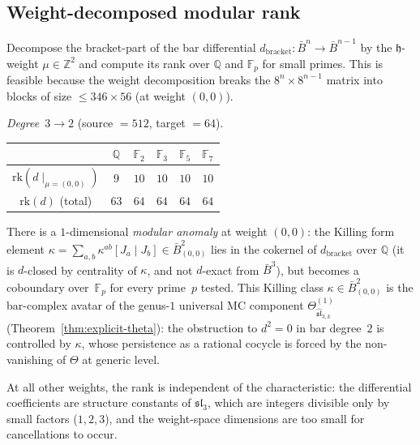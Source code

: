 \subsection{Weight-decomposed modular rank}

\begin{computation}
\label{comp:sl3-modular-rank}

Decompose the bracket-part of the bar differential
$d_{\mathrm{bracket}}\colon \bar{B}^n \to \bar{B}^{n-1}$
by the $\mathfrak{h}$-weight $\mu \in \mathbb{Z}^2$ and
compute its rank over $\mathbb{Q}$ and $\mathbb{F}_p$ for
small primes.  This is feasible because the weight decomposition
breaks the $8^n \times 8^{n-1}$ matrix into blocks of size
$\leq 346 \times 56$ (at weight $(0,0)$).

\emph{Degree~$3 \to 2$} (source $= 512$, target $= 64$).
\begin{center}
\renewcommand{\arraystretch}{1.2}
\begin{tabular}{c|ccccc}
& $\mathbb{Q}$ & $\mathbb{F}_2$ & $\mathbb{F}_3$ &
$\mathbb{F}_5$ & $\mathbb{F}_7$ \\
\hline
$\mathrm{rk}(d \mid_{\mu=(0,0)})$ & $9$ & $10$ & $10$ & $10$ & $10$ \\
$\mathrm{rk}(d)$ (total) & $63$ & $64$ & $64$ & $64$ & $64$
\end{tabular}
\end{center}
There is a $1$-dimensional \emph{modular anomaly} at weight
$(0,0)$: the Killing form element
$\kappa = \sum_{a,b} \kappa^{ab} [J_a \mid J_b] \in \bar{B}^2_{(0,0)}$
lies in the cokernel of $d_{\mathrm{bracket}}$ over $\mathbb{Q}$
(it is $d$-closed by centrality of $\kappa$, and not $d$-exact
from $\bar{B}^3$), but becomes a coboundary
over~$\mathbb{F}_p$ for every prime~$p$ tested.
This Killing class $\kappa \in \bar{B}^2_{(0,0)}$ is the
bar-complex avatar of the genus-$1$ universal MC component
$\Theta^{(1)}_{\widehat{\mathfrak{sl}}_{3,k}}$
(Theorem~\ref{thm:explicit-theta}): the obstruction to
$d^2 = 0$ in bar degree~$2$ is controlled by $\kappa$,
whose persistence as a rational cocycle is forced by the
non-vanishing of $\Theta$ at generic level.

At all other weights, the rank is independent of the characteristic:
the differential coefficients are structure constants of
$\mathfrak{sl}_3$, which are integers divisible only by small factors
($1, 2, 3$), and the weight-space dimensions are too small for
cancellations to occur.


\end{computation}
